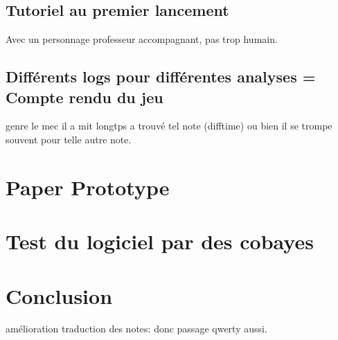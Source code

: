 \documentclass{article}
\begin{document}
\subsection{Tutoriel au premier lancement}
Avec un personnage professeur accompagnant, pas trop humain.

\subsection{Différents logs pour différentes analyses = Compte rendu du jeu}
genre le mec il a mit longtps a trouvé tel note (difftime) ou bien il se trompe souvent pour telle autre note.




\section{Paper Prototype}

\section{Test du logiciel par des cobayes}
\section{Conclusion}
amélioration traduction des notes: donc passage qwerty aussi.
\end{document}
